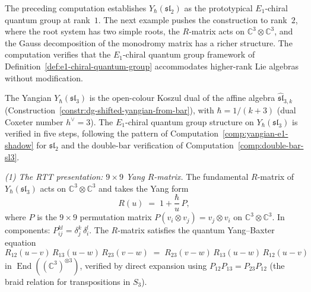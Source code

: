 The preceding computation establishes $Y_\hbar(\mathfrak{sl}_2)$
as the prototypical $E_1$-chiral quantum group at rank~$1$.
The next example pushes the construction to rank~$2$,
where the root system has two simple roots, the $R$-matrix
acts on $\mathbb{C}^3\otimes\mathbb{C}^3$, and the Gauss
decomposition of the monodromy matrix has a richer structure.
The computation verifies that the $E_1$-chiral quantum group
framework of Definition~\ref{def:e1-chiral-quantum-group}
accommodates higher-rank Lie algebras without modification.

\begin{example}%
\label{ex:yangian-sl3-e1-chiral-qg}%
%
%
%
%
%
The Yangian $Y_\hbar(\mathfrak{sl}_3)$ is the open-colour
Koszul dual of the affine algebra
$\widehat{\mathfrak{sl}}_{3,k}$
(Construction~\ref{constr:dg-shifted-yangian-from-bar}),
with $\hbar = 1/(k{+}3)$ (dual Coxeter number $h^\vee = 3$).
The $E_1$-chiral quantum group structure on
$Y_\hbar(\mathfrak{sl}_3)$ is verified in five steps,
following the pattern of
Computation~\ref{comp:yangian-e1-shadow} for $\mathfrak{sl}_2$
and the double-bar verification of
Computation~\ref{comp:double-bar-sl3}.

\medskip
\noindent\emph{(1) The RTT presentation: $9\times 9$ Yang
$R$-matrix.}
The fundamental $R$-matrix of $Y_\hbar(\mathfrak{sl}_3)$ acts
on
$\mathbb{C}^3\otimes\mathbb{C}^3$ and takes the Yang form
\begin{equation}\label{eq:sl3-yang-R}
R(u)
\;=\;
1 + \frac{\hbar}{u}\,P,
\end{equation}
where $P$ is the $9\times 9$ permutation matrix
$P(v_i\otimes v_j) = v_j\otimes v_i$ on
$\mathbb{C}^3\otimes\mathbb{C}^3$. In components:
$P^{kl}_{ij} = \delta^k_j\,\delta^l_i$.
The $R$-matrix satisfies the quantum Yang--Baxter equation
\begin{equation}\label{eq:sl3-qybe}
R_{12}(u{-}v)\,R_{13}(u{-}w)\,R_{23}(v{-}w)
\;=\;
R_{23}(v{-}w)\,R_{13}(u{-}w)\,R_{12}(u{-}v)
\end{equation}
in $\operatorname{End}((\mathbb{C}^3)^{\otimes 3})$,
verified by direct expansion using $P_{12}P_{13} = P_{23}P_{12}$
(the braid relation for transpositions in $S_3$).


\end{example}
